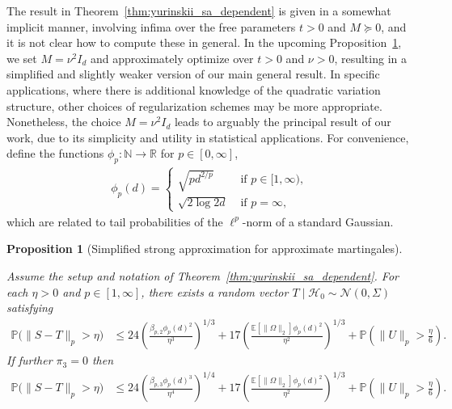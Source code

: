\documentclass[11pt,lof]{puthesis}
\renewcommand{\P}{\ensuremath{\mathbb{P}}}
\newcommand{\N}{\ensuremath{\mathbb{N}}}
\newcommand{\R}{\ensuremath{\mathbb{R}}}
\newcommand{\E}{\ensuremath{\mathbb{E}}}
\newcommand{\cH}{\ensuremath{\mathcal{H}}}
\newcommand{\cN}{\ensuremath{\mathcal{N}}}
\theoremstyle{break}
\newtheorem{proposition}{Proposition}[section]
\theoremstyle{proof}
\begin{document}
The result in Theorem~\ref{thm:yurinskii_sa_dependent} is given in a somewhat
implicit manner, involving infima over the free parameters $t > 0$ and $M
\succeq 0$, and it is not clear how to compute these in general. In the upcoming
Proposition~\ref{pro:yurinskii_sa_simplified}, we set $M = \nu^2 I_d$ and
approximately optimize over $t > 0$ and $\nu > 0$, resulting in a simplified and
slightly weaker version of our main general result. In specific applications,
where there is additional knowledge of the quadratic variation structure, other
choices of regularization schemes may be more appropriate. Nonetheless, the
choice $M = \nu^2 I_d$ leads to arguably the principal result of our work, due
to its simplicity and utility in statistical applications. For convenience,
define the functions $\phi_p : \N \to \R$ for $p \in [0, \infty]$,
%
\begin{align*}
  \phi_p(d) =
  \begin{cases}
    \sqrt{pd^{2/p} } & \text{ if } p \in [1,\infty), \\
    \sqrt{2\log 2d} & \text{ if } p =\infty,
  \end{cases}
\end{align*}
%
which are related to tail probabilities
of the $\ell^p$-norm of a standard Gaussian.

\begin{proposition}[Simplified strong approximation
  for approximate martingales]%
  \label{pro:yurinskii_sa_simplified}

  Assume the setup and notation of Theorem~\ref{thm:yurinskii_sa_dependent}.
  For each $\eta > 0$ and $p \in [1,\infty]$,
  there exists a random vector $T \mid \cH_0 \sim \cN(0, \Sigma)$ satisfying
  \begin{align*}
    \P\big(\|S-T\|_p > \eta\big)
    &\leq
    24 \left(
      \frac{\beta_{p,2} \phi_p(d)^2}{\eta^3}
    \right)^{1/3}
    + 17 \left(
      \frac{\E \left[ \|\Omega\|_2 \right] \phi_p(d)^2}{\eta^2}
    \right)^{1/3}
    +\P\left(\|U\|_p>\frac{\eta}{6}\right).
  \end{align*}
  If further $\pi_3 = 0$ then
  \begin{align*}
    \P\big(\|S-T\|_p > \eta\big)
    &\leq
    24 \left(
      \frac{\beta_{p,3} \phi_p(d)^3}{\eta^4}
    \right)^{1/4}
    + 17 \left(
      \frac{\E \left[ \|\Omega\|_2 \right] \phi_p(d)^2}{\eta^2}
    \right)^{1/3}
    +\P\left(\|U\|_p>\frac{\eta}{6}\right).
  \end{align*}
\end{proposition}
\end{document}
